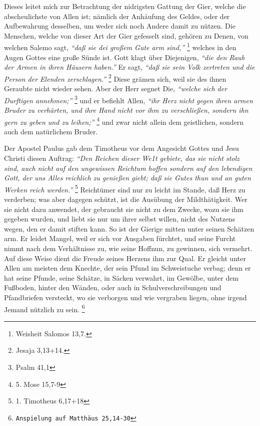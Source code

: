 Dieses leitet mich zur Betrachtung der nidrigsten Gattung der Gier, welche die
abscheulichste von Allen ist; nämlich der Anhäufung des Geldes, oder der
Aufbewahrung desselben, um weder sich noch Andere damit zu nützen. Die Menschen,
welche von dieser Art der Gier gefesselt sind, gehören zu Denen, von welchen
Salemo sagt,
\textit{"`daß sie dei großem Gute arm sind,"'}
\footnote{Weisheit Salomos 13,7.}
welches in den Augen Gottes eine große Sünde ist. Gott klagt
über Diejenigen,
\textit{"`die den Raub der Armen in ihren Häusern haben."'} Er sagt,
\textit{"`daß sie sein Volk
zertreten und die Person der Elenden zerschlagen."'}
\footnote{Jesaja 3,13+14.}
Diese grämen sich, weil sie des ihnen Geraubte nicht wieder sehen. Aber der Herr
segnet Die, \textit{"`welche sich der Durftigen annehmen;"'}
\footnote{Psalm 41,1}
und er
befiehlt Allen,
\textit{"`ihr Herz nicht gegen ihren armen Bruder zu verhärten, und ihre
Hand nicht vor ihm zu verschließen, sondern ihn gern zu geben und zu
leihen;"'}
\footnote{5. Mose 15,7-9}
und zwar nicht allein dem geistlichen,
sondern auch dem natürlichem Bruder.

\medskip

Der Apostel Paulus gab dem Timotheus vor dem Angesicht Gottes und Jesu Christi
diesen Auftrag:
\textit{"`Den Reichen dieser We1t gebiete, das sie nicht stolz sind,
auch nicht auf den ungewissen Reichtum hoffen sondern auf den lebendigen Gott,
der uns Alles reichlich zu genießen giebt; daß sie Gutes thun und an guten
Werken reich werden."'}
\footnote{1. Timotheus 6,17+18}
Reichtümer sind nur zu leicht
im Stande, daß Herz zu verderben; was aber
dagegen schützt, ist die Ausübung der
Mildthätigkeit. Wer sie nicht dazu anwendet, der gebraucht
sie nicht zu dem
Zwecke, wozu sie ihm gegeben wurden, und liebt sie nur um ihrer selbst willen,
nicht des Nutzens wegen, den er damit stiften kann. So
ist der Gierige mitten
unter seinen Schätzen arm. Er leidet Mangel, weil er sich vor Ausgaben fürchtet,
und seine Furcht nimmt nach dem Verhältnisse zu, wie
seine Hoffnun, zu gewinnen,
sich vermehrt. Auf diese Weise dient die Freude seines Herzens ihm zur Qual. Er
gleicht unter Allen am meisten dem Knechte, der sein Pfund im Schweistuche
verbag; denn er hat seine Pfunde, seine Schätze, in Säcken verwahrt, im Gewölbe,
unter dem Fußboden, hinter den Wänden, oder auch in Schulverschreibungen und
Pfandbriefen versteckt, wo sie verborgen und wie vergraben liegen, ohne irgend
Jemand nützlich zu sein.
\footnote{\texttt{Anspielung auf Matthäus 25,14-30}}

